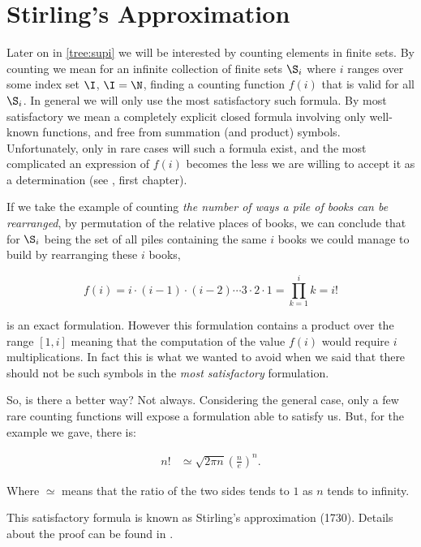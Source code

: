 \section{Stirling's Approximation}
\label{tree:sorting:stirling}

Later on in \ref{tree:supi} we will be interested by counting elements in
finite sets. By counting we mean for an infinite collection of finite sets
$\S_i$ where $i$ ranges over some index set $\I$, \eg $\I = \N$, finding a
counting function $f(i)$ that is valid for all $\S_i$. In general we will only
use the most satisfactory such formula. By most satisfactory we mean a
completely explicit closed formula involving only well-known functions, and
free from summation (and product) symbols. Unfortunately, only in rare cases
will such a formula exist, and the most complicated an expression of $f(i)$
becomes the less we are willing to accept it as a determination
(see \citet*{Stanley:2011:ECV:2124415}, first chapter).

If we take the example of counting \emph{the number of ways a pile of books can
be rearranged}, \ie by permutation of the relative places of books, we can
conclude that for $\S_i$ being the set of all piles containing the same $i$
books we could manage to build by rearranging these $i$ books,

$$ f(i) = i \cdot (i-1) \cdot (i-2) \cdots 3 \cdot 2 \cdot 1 = \prod_{k=1}^i k = i! $$

is an exact formulation. However this formulation contains a product over the range
$[1, i]$ meaning that the computation of the value $f(i)$ would require $i$
multiplications. In fact this is what we wanted to avoid when we said that
there should not be such symbols in the \emph{most satisfactory} formulation.

So, is there a better way? Not always. Considering the general case, only a few
rare counting functions will expose a formulation able to satisfy us. But, for
the example we gave, there is:

\begin{theorem}
\label{tree:sorting:theorem/stirling}
\begin{align*}
n! &\simeq \sqrt{2 \pi n} \left(\frac{n}{e}\right)^n.
\end{align*}
\end{theorem}

Where \(\simeq\) means that the ratio of the two sides tends to \(1\) as \(n\)
tends to infinity.

This satisfactory formula is known as Stirling's approximation (1730). Details
about the proof can be found in \citet*{feller1967direct}.

